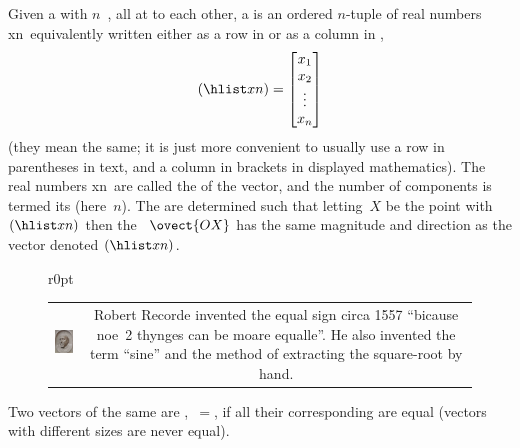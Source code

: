 \begin{definition} \label{def:vecs} 
Given a  with \(n\)~, all at  to each other, a  is an ordered \(n\)-tuple of real numbers \hlist xn\ equivalently written either as a row in  or as a column in ,
\begin{equation*}
(\hlist xn)=\begin{bmatrix} x_1\\x_2\\\vdots\\x_n \end{bmatrix}
\end{equation*}
(they mean the same; it is just more convenient to usually use a row in parentheses in text, and a column in brackets in displayed mathematics).
The real numbers \hlist xn\ are called the  of the vector, and the number of components is termed its  (here~\(n\)).
The  are determined such that letting~\(X\) be the point with  \((\hlist xn)\) then the ~\(\ovect{OX}\) has the same magnitude and direction as the vector denoted \((\hlist xn)\).

\begin{adjustbox}{valign=t,minipage={\linewidth}}
\begin{figure}r{0pt} \begin{tabular}{@{}cc@{}}
\includegraphics[width=4.5em]{Vectors/RobertRecorde}&
\parbox[b]{16em}{\rm
Robert Recorde invented the equal sign circa 1557 ``bicause noe~2 thynges can be moare equalle''.  
He also invented the term ``sine'' and the method of extracting the square-root by hand.}
\end{tabular} \end{figure}\strut{}%
Two vectors of the same  are ,~\(=\), if all their corresponding  are equal (vectors with different sizes are never equal).
\vspace{1\baselineskip}
\end{adjustbox}
\end{definition}




